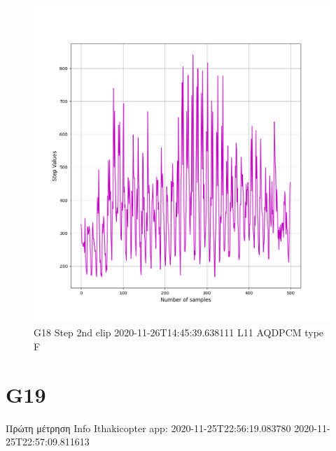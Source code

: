\documentclass[hidelinks, 12pt, a4paper]{article}
\begin{document}
\begin{figure}[h!]
\centering
	\includegraphics[height=.38\textheight, width=\textwidth]{assets/session1/g18.png}
    \caption{G18 Step 2nd clip   2020-11-26T14:45:39.638111  L11 AQDPCM type F}
\end{figure}



\section{G19}
Πρώτη μέτρηση
Info Ithakicopter app:
2020-11-25T22:56:19.083780
2020-11-25T22:57:09.811613
\end{document}
